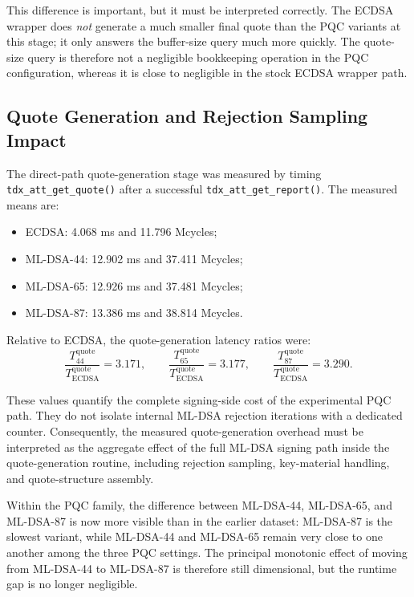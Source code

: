 This difference is important, but it must be interpreted correctly. The
ECDSA wrapper does \emph{not} generate a much smaller final quote than the PQC
variants at this stage; it only answers the buffer-size query much more
quickly. The quote-size query is therefore not a negligible bookkeeping
operation in the PQC configuration, whereas it is close to negligible in the
stock ECDSA wrapper path.

\subsection{Quote Generation and Rejection Sampling Impact}

The direct-path quote-generation stage was measured by timing
\texttt{tdx\_att\_get\_quote()} after a successful
\texttt{tdx\_att\_get\_report()}. The measured means are:

\begin{itemize}
  \item ECDSA: 4.068 ms and 11.796 Mcycles;
  \item ML-DSA-44: 12.902 ms and 37.411 Mcycles;
  \item ML-DSA-65: 12.926 ms and 37.481 Mcycles;
  \item ML-DSA-87: 13.386 ms and 38.814 Mcycles.
\end{itemize}

Relative to ECDSA, the quote-generation latency ratios were:
\[
  \frac{T^{\mathrm{quote}}_{44}}{T^{\mathrm{quote}}_{\mathrm{ECDSA}}} = 3.171,
  \qquad
  \frac{T^{\mathrm{quote}}_{65}}{T^{\mathrm{quote}}_{\mathrm{ECDSA}}} = 3.177,
  \qquad
  \frac{T^{\mathrm{quote}}_{87}}{T^{\mathrm{quote}}_{\mathrm{ECDSA}}} = 3.290.
\]

These values quantify the complete signing-side cost of the experimental PQC
path. They do not isolate internal ML-DSA rejection iterations with a
dedicated counter. Consequently, the measured quote-generation overhead must
be interpreted as the aggregate effect of the full ML-DSA signing path inside
the quote-generation routine, including rejection sampling, key-material
handling, and quote-structure assembly.

Within the PQC family, the difference between ML-DSA-44, ML-DSA-65, and
ML-DSA-87 is now more visible than in the earlier dataset: ML-DSA-87 is the
slowest variant, while ML-DSA-44 and ML-DSA-65 remain very close to one
another among the three PQC settings. The principal monotonic effect of moving from ML-DSA-44 to
ML-DSA-87 is therefore still dimensional, but the runtime gap is no longer
negligible.

